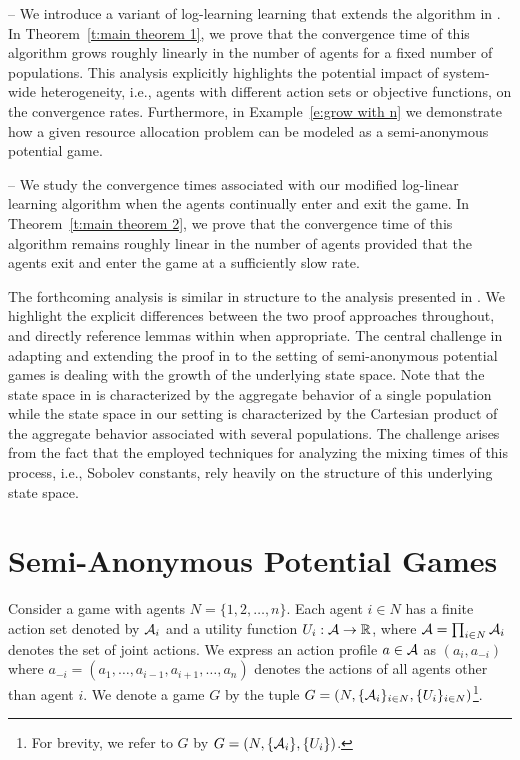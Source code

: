 \vspace{.1cm}
%
\noindent -- We introduce a variant of log-learning learning that extends the algorithm in \cite{Shah2010}.  In Theorem~\ref{t:main theorem 1}, we prove that the convergence time of this algorithm grows roughly linearly in the number of agents for a fixed number of populations.  This analysis explicitly highlights the potential impact of system-wide heterogeneity, i.e., agents with different action sets or objective functions, on the convergence rates.  Furthermore, in Example~\ref{e:grow with n} we demonstrate how a given resource allocation problem can be modeled as a semi-anonymous potential game.  

\vspace{.1cm}
%
\noindent -- We study the convergence times associated with our modified log-linear learning algorithm when the agents continually enter and exit the game.  In Theorem~\ref{t:main theorem 2}, we prove that the convergence time of this algorithm remains roughly linear in the number of agents provided that the agents exit and enter the game at a sufficiently slow rate. 

The forthcoming analysis is similar in structure to the analysis presented in \cite{Shah2010}.  We highlight the explicit differences between the two proof approaches throughout, and directly reference lemmas within \cite{Shah2010} when appropriate.  The central challenge in adapting and extending the proof in \cite{Shah2010} to the setting of semi-anonymous potential games is dealing with the growth of the underlying state space.  Note that the state space in \cite{Shah2010} is characterized by the aggregate behavior of a single population while the state space in our setting is characterized by the Cartesian product of the aggregate behavior associated with several populations.  The challenge arises from the fact that the employed techniques for analyzing the mixing times of this process, i.e., Sobolev constants, rely heavily on the structure of this underlying state space.  



\section{Semi-Anonymous Potential Games}

Consider a game with agents $N = \{1,2,\ldots,n\}$. Each agent $i \in N$ has a finite action set denoted by ${\cal A}_i$ and a utility function $U_i : {\cal A} \rightarrow \mathbb{R}$, where ${\cal A} = \prod_{i \in N} {\cal A}_i$ denotes the set of joint actions.   We express an action profile $a \in {\cal A}$ as $(a_i,a_{-i})$ where $a_{-i} = (a_1,\ldots,a_{i-1},a_{i+1},\ldots, a_n)$ denotes the actions of all agents other than agent $i$.  We denote a game $G$ by the tuple $G = \left(N, \{{\cal A}_i\}_{i\in N}, \{U_i\}_{i \in N}\right)$\footnote{For brevity, we refer to $G$ by $G = \left(N, \{{\cal A}_i\}, \{U_i\}\right)$. }.  



